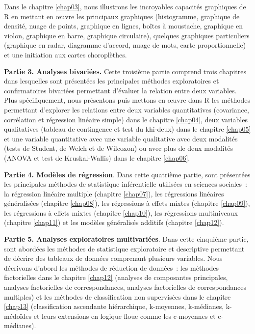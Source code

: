 \documentclass[
  11pt,
  french,
]{book}
\begin{document}
Dans le chapitre \ref{chap03}, nous illustrons les incroyables capacités graphiques de R en mettant en œuvre les principaux graphiques (histogramme, graphique de densité, nuage de points, graphique en lignes, boîtes à moustache, graphique en violon, graphique en barre, graphique circulaire), quelques graphiques particuliers (graphique en radar, diagramme d'accord, nuage de mots, carte proportionnelle) et une initiation aux cartes choroplèthes.

\textbf{Partie 3. Analyses bivariées.} Cette troisième partie comprend trois chapitres dans lesquelles sont présentées les principales méthodes exploratoires et confirmatoires bivariées permettant d'évaluer la relation entre deux variables. Plus spécifiquement, nous présentons puis mettons en œuvre dans R les méthodes permettant d'explorer les relations entre deux variables quantitatives (covariance, corrélation et régression linéaire simple) dans le chapitre \ref{chap04}, deux variables qualitatives (tableau de contingence et test du khi-deux) dans le chapitre \ref{chap05} et une variable quantitative avec une variable qualitative avec deux modalités (tests de Student, de Welch et de Wilcoxon) ou avec plus de deux modalités (ANOVA et test de Kruskal-Wallis) dans le chapitre \ref{chap06}.

\textbf{Partie 4. Modèles de régression}. Dans cette quatrième partie, sont présentées les principales méthodes de statistique inférentielle utilisées en sciences sociales~: la régression linéaire multiple (chapitre \ref{chap07}), les régressions linéaires généralisées (chapitre \ref{chap08}), les régressions à effets mixtes (chapitre \ref{chap09}), les régressions à effets mixtes (chapitre \ref{chap10}), les régressions multiniveaux (chapitre \ref{chap11}) et les modèles généralisés additifs (chapitre \ref{chap12}).

\textbf{Partie 5. Analyses exploratoires multivariées}. Dans cette cinquième partie, sont abordées les méthodes de statistique exploratoire et descriptive permettant de décrire des tableaux de données comprenant plusieurs variables. Nous décrivons d'abord les méthodes de réduction de données~: les méthodes factorielles dans le chapitre \ref{chap12} (analyses de composantes principales, analyses factorielles de correspondances, analyses factorielles de correspondances multiples) et les méthodes de classification non supervisées dans le chapitre \ref{chap13} (classification ascendante hiérarchique, k-moyennes, k-médianes, k-médoïdes et leurs extensions en logique floue comme les c-moyennes et c-médianes).
\end{document}
